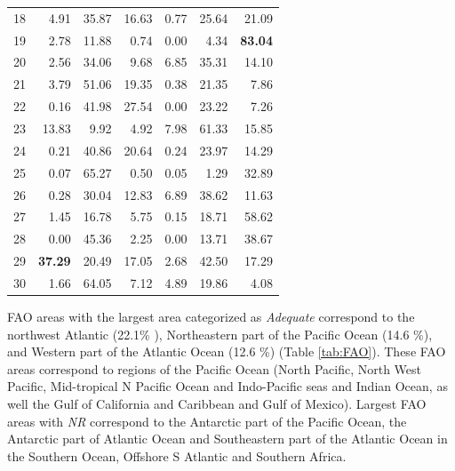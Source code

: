 \documentclass[12pt,authoryear]{elsarticle}
\begin{document}
\begin{table}[]
\begin{tabular}{c | r r r r r r }
  18 &  4.91 &  35.87 & 16.63 &  0.77 & 25.64 & 21.09 \\ 
  19 &  2.78 &  11.88 &  0.74 &  0.00 &  4.34 & \textbf{83.04} \\ 
  20 &  2.56 &  34.06 &  9.68 &  6.85 & 35.31 & 14.10 \\ 
  21 &  3.79 &  51.06 & 19.35 &  0.38 & 21.35 &  7.86 \\ 
  22 &  0.16 &  41.98 & 27.54 &  0.00 & 23.22 &  7.26 \\ 
  23 & 13.83 &   9.92 &  4.92 &  7.98 & 61.33 & 15.85 \\ 
  24 &  0.21 &  40.86 & 20.64 &  0.24 & 23.97 & 14.29 \\ 
  25 &  0.07 &  65.27 &  0.50 &  0.05 &  1.29 & 32.89 \\ 
  26 &  0.28 &  30.04 & 12.83 &  6.89 & 38.62 & 11.63 \\ 
  27 &  1.45 &  16.78 &  5.75 &  0.15 & 18.71 & 58.62 \\ 
  28 &  0.00 &  45.36 &  2.25 &  0.00 & 13.71 & 38.67 \\ 
  29 & \textbf{37.29} &  20.49 & 17.05 &  2.68 & 42.50 & 17.29 \\ 
  30 &  1.66 &  64.05 &  7.12 &  4.89 & 19.86 &  4.08 \\ 
  \hline
   \hline
\end{tabular}
\end{table}


FAO areas with the largest area categorized as \textit{Adequate} correspond to the northwest Atlantic (22.1\% ), Northeastern part of the Pacific Ocean (14.6 \%), and Western part of the Atlantic Ocean (12.6 \%) (Table \ref{tab:FAO}). These FAO areas correspond to regions of the Pacific Ocean (North Pacific, North West Pacific, Mid-tropical N Pacific Ocean and Indo-Pacific seas and Indian Ocean, as well the Gulf of California and Caribbean and Gulf of Mexico). Largest FAO areas with \textit{NR} correspond to the Antarctic part of the Pacific Ocean, the Antarctic part of Atlantic Ocean and Southeastern part of the Atlantic Ocean in the Southern Ocean, Offshore S Atlantic and Southern Africa. 

\end{document}
